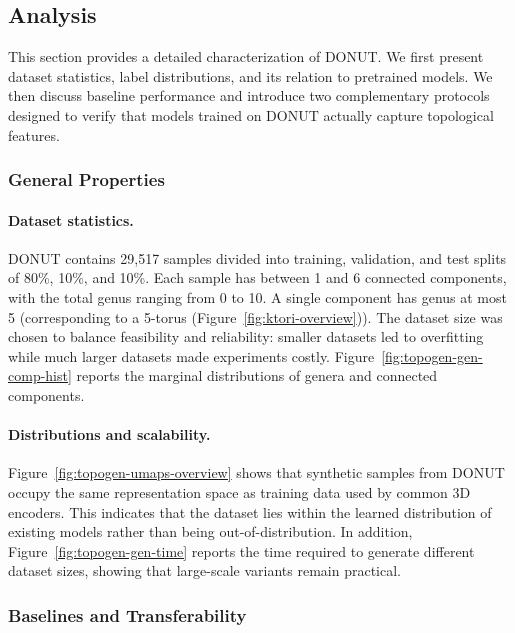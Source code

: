 \subsection{Analysis}

This section provides a detailed characterization of DONUT. We first present dataset statistics, label distributions, and its relation to pretrained models. We then discuss baseline performance and introduce two complementary protocols designed to verify that models trained on DONUT actually capture topological features.

\subsubsection{General Properties}
\label{sssec:topogen-general-properties}

\paragraph{Dataset statistics.}
DONUT contains 29,517 samples divided into training, validation, and test splits of 80\%, 10\%, and 10\%. Each sample has between 1 and 6 connected components, with the total genus ranging from 0 to 10. A single component has genus at most 5 (corresponding to a 5-torus (Figure~\ref{fig:ktori-overview})). The dataset size was chosen to balance feasibility and reliability: smaller datasets led to overfitting while much larger datasets made experiments costly. Figure~\ref{fig:topogen-gen-comp-hist} reports the marginal distributions of genera and connected components.

\paragraph{Distributions and scalability.}
Figure~\ref{fig:topogen-umaps-overview} shows that synthetic samples from DONUT occupy the same representation space as training data used by common 3D encoders. This indicates that the dataset lies within the learned distribution of existing models rather than being out-of-distribution. In addition, Figure~\ref{fig:topogen-gen-time} reports the time required to generate different dataset sizes, showing that large-scale variants remain practical.

\subsubsection{Baselines and Transferability}
\label{sssec:topogen-transferability}

